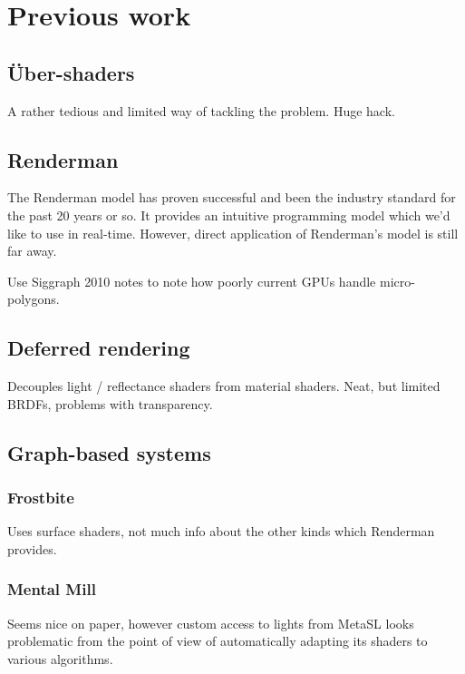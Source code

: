 
\chapter{ Previous work }
\label{Chapter3}

\section{Über-shaders}

A rather tedious and limited way of tackling the problem. Huge hack.

\section{Renderman}

The Renderman model has proven successful and been the industry standard for the past 20 years or so. It provides an intuitive programming model which we'd like to use in real-time. However, direct application of Renderman's model is still far away.

Use Siggraph 2010 notes to note how poorly current GPUs handle micro-polygons.

\section{Deferred rendering}

Decouples light / reflectance shaders from material shaders. Neat, but limited BRDFs, problems with transparency.

\section{Graph-based systems}
\subsection{Frostbite}

Uses surface shaders, not much info about the other kinds which Renderman provides.

\subsection{Mental Mill}

Seems nice on paper, however custom access to lights from MetaSL looks problematic from the point of view of automatically adapting its shaders to various algorithms.

